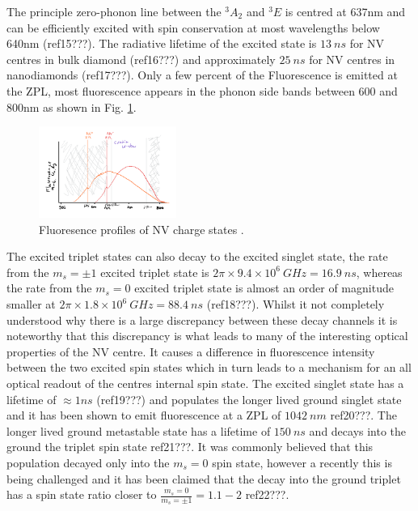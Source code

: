 \documentclass[preprint,prl,twocolumn]{revtex4}
\begin{document}
The principle zero-phonon line between the $^3A_2$ and $^3E$ is centred at 637nm and can be efficiently excited with spin conservation at most wavelengths below 640nm (ref15???). The radiative lifetime of the excited state is $\SI{13}{ns}$ for NV centres in bulk diamond (ref16???) and approximately $\SI{25}{ns}$ for NV centres in nanodiamonds (ref17???). Only a few percent of the Fluorescence is emitted at the ZPL, most fluorescence appears in the phonon side bands between 600 and 800nm as shown in Fig. \ref{FigFluoro}.

\begin{figure}[t]
  \centering
  \includegraphics[width=0.4\textwidth]{Fluoro.png} 
 \caption{ Fluoresence profiles of NV charge states .} \label{FigFluoro}
\end{figure}

The excited triplet states can also decay to the excited singlet state, the rate from the $m_s=\pm1$ excited triplet state is $2\pi\times9.4\times10^6\SI{}{GHz} = \SI{16.9}{ns}$, whereas the rate from the $m_s=0$ excited triplet state is almost an order of magnitude smaller at $ 2\pi\times1.8\times10^6 \SI{}{GHz} = \SI{88.4}{ns}$ (ref18???). Whilst it not completely understood why there is a large discrepancy between these decay channels it is noteworthy that this discrepancy is what leads to many of the interesting optical properties of the NV centre. It causes a difference in fluorescence intensity between the two excited spin states which in turn leads to a mechanism for an all optical readout of the centres internal spin state. The excited singlet state has a lifetime of $\approx\si{1}{ns}$ (ref19???) and populates the longer lived ground singlet state and it has been shown to emit fluorescence at a ZPL of $\SI{1042}{nm}$ ref20???. The longer lived ground metastable state has a lifetime of $\SI{150}{ns}$ and decays into the ground the triplet spin state ref21???. It was commonly believed that this population decayed only into the $m_s=0$ spin state, however a recently this is being challenged and it has been claimed that the decay into the ground triplet has a spin state ratio closer to $\frac{m_s=0}{m_s=\pm1} = 1.1-2$ ref22???. 
\end{document}
